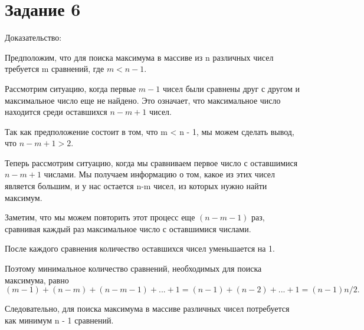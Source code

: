 
\section*{Задание 6}

Доказательство:

Предположим, что для поиска максимума в массиве из n различных чисел требуется m сравнений, где $m < n - 1$.

Рассмотрим ситуацию, когда первые $m-1$ чисел были сравнены друг с другом и максимальное число еще не найдено. Это означает, что максимальное число находится среди оставшихся $n-m+1$ чисел.

Так как предположение состоит в том, что m < n - 1, мы можем сделать вывод, что $n-m+1 > 2.$

Теперь рассмотрим ситуацию, когда мы сравниваем первое число с оставшимися $ n-m+1 $ числами. Мы получаем информацию о том, какое из этих чисел является большим, и у нас остается n-m чисел, из которых нужно найти максимум.

Заметим, что мы можем повторить этот процесс еще $(n-m-1)$ раз, сравнивая каждый раз максимальное число с оставшимися числами.

После каждого сравнения количество оставшихся чисел уменьшается на 1.

Поэтому минимальное количество сравнений, необходимых для поиска максимума, равно $(m-1) + (n-m) + (n-m-1) + ... + 1 = (n-1) + (n-2) + ... + 1 = (n-1)n/2.$

Следовательно, для поиска максимума в массиве различных чисел потребуется как минимум n - 1 сравнений.